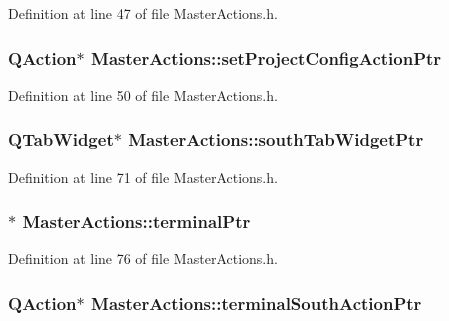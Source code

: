 Definition at line 47 of file Master\-Actions.\-h.

\hypertarget{class_master_actions_abe52f232f77f5a5bff35c8e3dadb3d80}{
\subsubsection[{set\-Project\-Config\-Action\-Ptr}]{\setlength{\rightskip}{0pt plus 5cm}Q\-Action$\ast$ Master\-Actions\-::set\-Project\-Config\-Action\-Ptr\hspace{0.3cm}{\ttfamily [private]}}}\label{class_master_actions_abe52f232f77f5a5bff35c8e3dadb3d80}


Definition at line 50 of file Master\-Actions.\-h.

\hypertarget{class_master_actions_ae50dea40859da966d8b8a27d2069f6d7}{
\subsubsection[{south\-Tab\-Widget\-Ptr}]{\setlength{\rightskip}{0pt plus 5cm}Q\-Tab\-Widget$\ast$ Master\-Actions\-::south\-Tab\-Widget\-Ptr\hspace{0.3cm}{\ttfamily [private]}}}\label{class_master_actions_ae50dea40859da966d8b8a27d2069f6d7}


Definition at line 71 of file Master\-Actions.\-h.

\hypertarget{class_master_actions_accb886e749ad46cb6373187e59921bcf}{
\subsubsection[{terminal\-Ptr}]{$\ast$ Master\-Actions\-::terminal\-Ptr\hspace{0.3cm}{\ttfamily [private]}}}\label{class_master_actions_accb886e749ad46cb6373187e59921bcf}


Definition at line 76 of file Master\-Actions.\-h.

\hypertarget{class_master_actions_ad96c9f17230e162e9a9f39a867101a53}{
\subsubsection[{terminal\-South\-Action\-Ptr}]{\setlength{\rightskip}{0pt plus 5cm}Q\-Action$\ast$ Master\-Actions\-::terminal\-South\-Action\-Ptr\hspace{0.3cm}{\ttfamily [private]}}}\label{class_master_actions_ad96c9f17230e162e9a9f39a867101a53}


